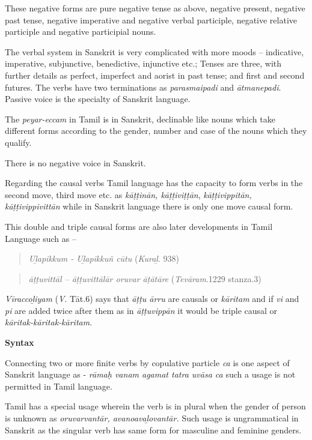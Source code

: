 These negative forms are pure negative tense as above, negative present, negative past tense, negative imperative and negative verbal participle, negative relative participle and negative participial nouns.

The verbal system in Sanskrit is very complicated with more moods – indicative, imperative, subjunctive, benedictive, injunctive etc.; Tenses are three, with further details as perfect, imperfect and aorist in past tense; and first and second futures. The verbs have two terminations as \textit{parasmaipadi} and \textit{ātmanepadi}. Passive voice is the specialty of Sanskrit language.

The \textit{peyar-eccam} in Tamil is in Sanskrit, declinable like nouns which take different forms according to the gender, number and case of the nouns which they qualify.

There is no negative voice in Sanskrit. 

Regarding the causal verbs Tamil language has the capacity to form verbs in the second move, third move etc. as \textit{kāṭṭinān, kāṭṭiviṭṭān}, \textit{kāṭṭivippitān, kāṭṭivippivittān} while in Sanskrit language there is only one move causal form.

This double and triple causal forms are also later developments in Tamil Language such as –

\begin{verse}
\textit{Uḻapikkum - Uḻapikkuñ cūtu} (\textit{Kuraḻ}. 938)
\end{verse}

\begin{verse}
\textit{āṭṭuvittāl – āṭṭuvittālār oruvar āṭātāre} (\textit{Tevāram}.1229 stanza.3)
\end{verse}

\textit{Vīraccoḻiyam} (\textit{V}. Tāt.6) says that \textit{āṭṭu ārru} are causals or \textit{kāritam} and if \textit{vi} and\textit{ pi} are added twice after them as in \textit{āṭṭuvippān} it would be triple causal or \textit{kāritak-kāritak-kāritam}.

\textbf{Syntax}

Connecting two or more finite verbs by copulative particle \textit{ca} is one aspect of Sanskrit language as - \textit{rāmaḥ vanam agamat tatra uvāsa ca} such a usage is not permitted in Tamil language.

Tamil has a special usage wherein the verb is in plural when the gender of person is unknown as \textit{oruvarvantār, avanoavaḻovantār.} Such usage is ungrammatical in Sanskrit as the singular verb has same form for masculine and feminine genders.

